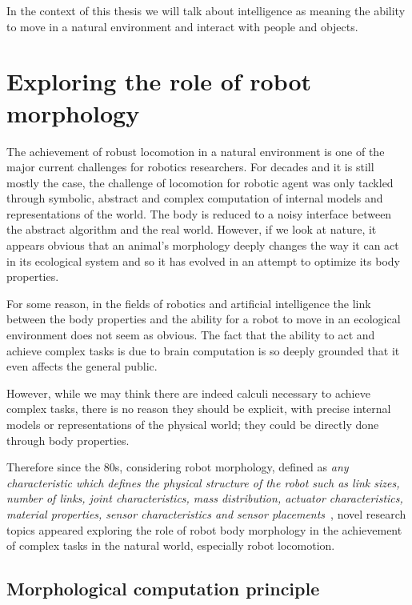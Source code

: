 In the context of this thesis we will talk about intelligence  as meaning the ability to move in a natural environment and interact with people and objects.



\section{Exploring the role of robot morphology} %

The achievement of robust locomotion in a natural environment is one of the major current challenges for robotics researchers. For decades and it is still mostly the case, the challenge of locomotion for robotic agent was only tackled through symbolic, abstract and complex computation of internal models and representations of the world. The body is reduced to a noisy interface between the abstract algorithm and the real world.
However, if we look at nature, it appears obvious that an animal’s morphology deeply changes the way it can act in its ecological system and so it has evolved in an attempt to optimize its body properties.

For some reason, in the fields of robotics and artificial intelligence the link between the body properties and the ability for a robot to move in an ecological environment does not seem as obvious. The fact that the ability to act and achieve complex tasks is due to brain computation is so deeply grounded that it even affects the general public.

However, while we may think there are indeed calculi necessary to achieve complex tasks, there is no reason they should be explicit, with precise internal models or representations of the physical world; they could be directly done through body properties.

Therefore since the 80s, considering robot morphology, defined as \emph{any characteristic which defines the physical structure of the robot such as link sizes, number of links, joint characteristics, mass distribution, actuator characteristics, material properties, sensor characteristics and sensor placements}~\parencite{paul2006morphological}, novel research topics appeared exploring the role of robot body morphology in the achievement of complex tasks in the natural world, especially robot locomotion.


\subsection{Morphological computation principle} %


